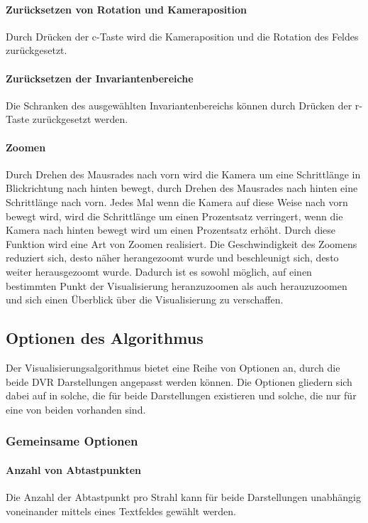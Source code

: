 \documentclass[a4paper,fontsize=12pt,toc=bib,parskip=half,ngerman]{scrartcl}
\begin{document}
\paragraph{Zur\"ucksetzen von Rotation und Kameraposition}
Durch Dr\"ucken der \glq c\grq{}-Taste wird die Kameraposition und die Rotation des Feldes zur\"uckgesetzt.
\paragraph{Zur\"ucksetzen der Invariantenbereiche}
Die Schranken des ausgew\"ahlten Invariantenbereichs k\"onnen durch Dr\"ucken der \glq r\grq{}-Taste zur\"uckgesetzt werden.
\paragraph{Zoomen}
Durch Drehen des Mausrades nach vorn wird die Kamera um eine Schrittl\"ange in Blickrichtung nach hinten bewegt, durch Drehen des Mausrades nach hinten eine Schrittl\"ange nach vorn. Jedes Mal wenn die Kamera auf diese Weise nach vorn bewegt wird, wird die Schrittl\"ange um einen Prozentsatz verringert, wenn die Kamera nach hinten bewegt wird um einen Prozentsatz erh\"oht. Durch diese Funktion wird eine Art von Zoomen realisiert. Die Geschwindigkeit des Zoomens reduziert sich, desto n\"aher herangezoomt wurde und beschleunigt sich, desto weiter herausgezoomt wurde. Dadurch ist es sowohl m\"oglich, auf einen bestimmten Punkt der Visualisierung heranzuzoomen als auch herauzuzoomen und sich einen \"Uberblick \"uber die Visualisierung zu verschaffen.

\subsection{Optionen des Algorithmus}
\label{Options}

Der Visualisierungsalgorithmus bietet eine Reihe von Optionen an, durch die beide DVR Darstellungen angepasst werden k\"onnen. Die Optionen gliedern sich dabei auf in solche, die f\"ur beide Darstellungen existieren und solche, die nur f\"ur eine von beiden vorhanden sind. 

\subsubsection{Gemeinsame Optionen}

\paragraph{Anzahl von Abtastpunkten}
Die Anzahl der Abtastpunkt pro Strahl kann f\"ur beide Darstellungen unabh\"angig voneinander mittels eines Textfeldes gew\"ahlt werden.
\end{document}
